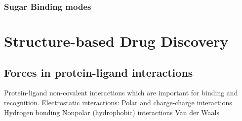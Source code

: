 \subsubsection{Sugar Binding modes}


\section{Structure-based Drug Discovery}
\subsection{Forces in protein-ligand interactions}
\begin{outline}
	\1 Protein-ligand non-covalent interactions which are important for binding and recognition.
		\2 Electrostatic interactions: Polar and charge-charge interactions
			\3 Hydrogen bonding
		\2 Nonpolar (hydrophobic) interactions
		  \3 Van der Waals
\end{outline}

